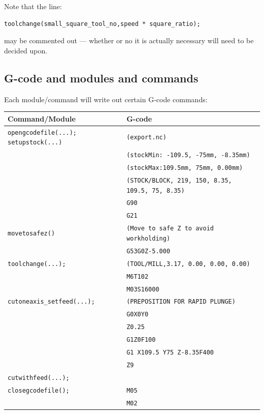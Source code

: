 \documentclass{ltxdoc}
\begin{document}
Note that the line:

\begin{verbatim}
toolchange(small_square_tool_no,speed * square_ratio);
\end{verbatim}

\noindent may be commented out --- whether or no it is actually necessary will need to be 
decided upon.
 
\subsection{G-code and modules and commands}
 
Each module/command will write out certain G-code commands:

\bigskip

\noindent \begin{tabular}{@{}ll@{}} \toprule
 Command/Module                    & G-code                                        \\ \midrule
 \texttt{opengcodefile(...);}
 \texttt{setupstock(...)}          & \texttt{(export.nc)}                          \\
                                   & \texttt{(stockMin: -109.5, -75mm, -8.35mm)}\\
                                   & \texttt{(stockMax:109.5mm, 75mm, 0.00mm)}\\
                                   & \texttt{(STOCK/BLOCK, 219, 150, 8.35, 109.5, 75, 8.35)}\\
                                   & \texttt{G90}\\
                                   & \texttt{G21} \\ \midrule
 \texttt{movetosafez()}            & \texttt{(Move to safe Z to avoid workholding)}\\
                                   & \texttt{G53G0Z-5.000}\\ \midrule
 \texttt{toolchange(...);}         & \texttt{(TOOL/MILL,3.17, 0.00, 0.00, 0.00)} \\
                                   & \texttt{M6T102} \\
                                   & \texttt{M03S16000} \\ \midrule
 \verb|cutoneaxis_setfeed(...);|   & \texttt{(PREPOSITION FOR RAPID PLUNGE)}\\
  & \texttt{G0X0Y0} \\
  & \texttt{Z0.25} \\
  & \texttt{G1Z0F100} \\
  & \texttt{G1 X109.5 Y75 Z-8.35F400} \\
  & \texttt{Z9}\\
 \texttt{cutwithfeed(...);}\\ \midrule

 \texttt{closegcodefile();}        & \texttt{M05}\\
                                   & \texttt{M02}\\ 
\bottomrule
\end{tabular}
\bigskip
\end{document}
